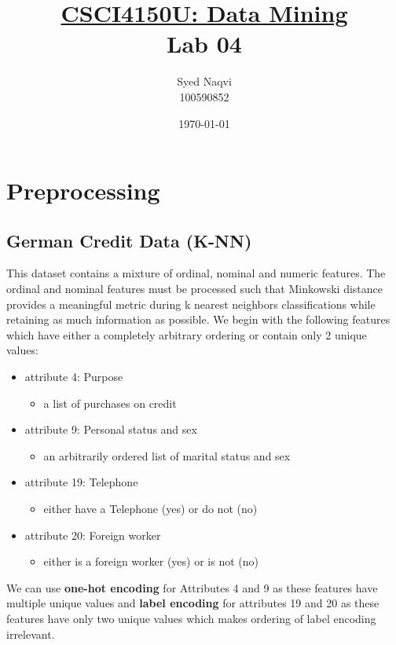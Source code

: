 \documentclass{article}
\title{\textbf{\underline{CSCI4150U: Data Mining}\\Lab 04}}
\author{Syed Naqvi\\100590852}
\date{\today}
\begin{document}
    \maketitle

    \section*{Preprocessing}
    \subsection*{German Credit Data (K-NN)}
    
    This dataset contains a mixture of ordinal, nominal and numeric features. The ordinal and nominal
    features must be processed such that Minkowski distance provides a meaningful metric
    during k nearest neighbors classifications while retaining as much information as possible.
    We begin with the following features which have either a completely arbitrary ordering or
    contain only 2 unique values:

    \begin{itemize}
        \item attribute 4: Purpose
        \begin{itemize}
            \item a list of purchases on credit
        \end{itemize}
        \item attribute 9: Personal status and sex
        \begin{itemize}
            \item an arbitrarily ordered list of marital status and sex
        \end{itemize}
        \item attribute 19: Telephone
        \begin{itemize}
            \item either have a Telephone (yes) or do not (no)
        \end{itemize}
        \item attribute 20: Foreign worker
        \begin{itemize}
            \item either is a foreign worker (yes) or is not (no)
        \end{itemize}
    \end{itemize}
    
    \newpage

    We can use \textbf{one-hot encoding} for Attributes 4 and 9 as these features have multiple
    unique values and \textbf{label encoding} for attributes 19 and 20 as these features have
    only two unique values which makes ordering of label encoding irrelevant.
\end{document}
